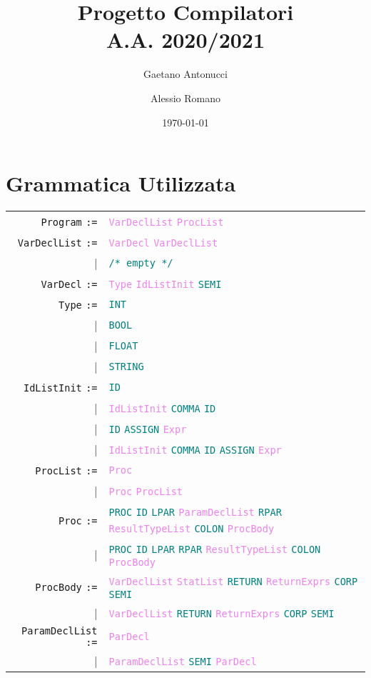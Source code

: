 \documentclass[a4paper,12pt]{article}
\title{Progetto Compilatori \\ \normalsize{A.A. 2020/2021}}
\author{Gaetano Antonucci \and Alessio Romano}
\date{\today}
\newcommand\nonterm[1]{\texttt{\textcolor{violet}{#1}}}
\newcommand\term[1]{\texttt{\textcolor{teal}{#1}}}
\newcommand\production[1]{\texttt{#1} \texttt{:=}}
\newcommand\emptyprod{\texttt{\textcolor{teal}{/* empty */}}}
\begin{document}
    \maketitle
    \tableofcontents
    \newpage
    
    \section{Grammatica Utilizzata}
    \begin{tabular}{rl}
    	\production{Program}     & \nonterm{VarDeclList} \nonterm{ProcList} \\
	\production{VarDeclList} & \nonterm{VarDecl} \nonterm{VarDeclList} \\
	                                     | & \emptyprod \\
	\production{VarDecl}      & \nonterm{Type} \nonterm{IdListInit} \term{SEMI} \\
	\production{Type}           & \term{INT} \\ 
					   | &\term{BOOL} \\ 
					   | &\term{FLOAT} \\
					   | &\term{STRING} \\
	\production{IdListInit}     &\term{ID} \\
					   |&\nonterm{IdListInit} \term{COMMA} \term{ID} \\
					   |&\term{ID} \term{ASSIGN} \nonterm{Expr} \\
					   |&\nonterm{IdListInit} \term{COMMA} \term{ID} \term{ASSIGN} \nonterm{Expr} \\
	\production{ProcList}    &\nonterm{Proc} \\
					  |&\nonterm{Proc} \nonterm{ProcList} \\
	\production{Proc}         & \term{PROC} \term{ID} \term{LPAR} \nonterm{ParamDeclList} \term{RPAR} \nonterm{ResultTypeList} \term{COLON} %
						\nonterm{ProcBody}\\
					  |& \term{PROC} \term{ID} \term{LPAR} \term{RPAR} \nonterm{ResultTypeList} \term{COLON} \nonterm{ProcBody}\\
	\production{ProcBody} & \nonterm{VarDeclList} \nonterm{StatList} \term{RETURN} \nonterm{ReturnExprs} \term{CORP} \term{SEMI} \\
	 				  |& \nonterm{VarDeclList} \term{RETURN} \nonterm{ReturnExprs} \term{CORP} \term{SEMI} \\
	\production{ParamDeclList} & \nonterm{ParDecl} \\
						  |& \nonterm{ParamDeclList} \term{SEMI} \nonterm{ParDecl} \\

\end{tabular}
\end{document}
